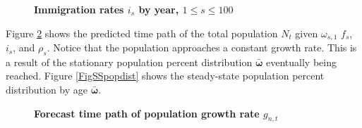 \documentclass[letterpaper,12pt]{article}
\theoremstyle{definition}
\begin{document}
  \begin{figure}[htbp]\centering \captionsetup{width=4.0in}
    \caption{\label{FigImmigRates}\textbf{Immigration rates $i_s$ by year, $1\leq s\leq 100$}}
  \end{figure}

  Figure \ref{FigPopPath} shows the predicted time path of the total population $N_t$ given $\omega_{s,1}$ $f_s$, $i_s$, and $\rho_s$. Notice that the population approaches a constant growth rate. This is a result of the stationary population percent distribution $\bm{\bar{\omega}}$ eventually being reached. Figure \ref{FigSSpopdist} shows the steady-state population percent distribution by age $\bm{\bar{\omega}}$.

  \begin{figure}[htbp]\centering \captionsetup{width=4.0in}
    \caption{\label{FigPopPath}\textbf{Forecast time path of population growth rate $g_{n,t}$}}
  \end{figure}
\end{document}
